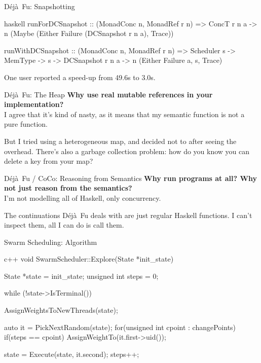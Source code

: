 \documentclass{beamer}
\newcommand{\dejafu}{D\'{e}j\`{a}~Fu}
\begin{document}
\begin{frame}[fragile]{\dejafu{}: Snapshotting}
\begin{center}
\begin{cminted}{haskell}
runForDCSnapshot :: (MonadConc n, MonadRef r n)
  => ConcT r n a
  -> n (Maybe (Either Failure (DCSnapshot r n a), Trace))

runWithDCSnapshot :: (MonadConc n, MonadRef r n)
  => Scheduler s
  -> MemType
  -> s
  -> DCSnapshot r n a
  -> n (Either Failure a, s, Trace)
\end{cminted}
\end{center}

One user reported a speed-up from 49.6s to 3.0s.
\end{frame}

\begin{frame}{\dejafu{}: The Heap}
  \textbf{Why use real mutable references in your implementation?}\\
  I agree that it's kind of nasty, as it means that my semantic
  function is not a pure function.

  But I tried using a heterogeneous map, and decided not to after
  seeing the overhead.  There's also a garbage collection problem: how
  do you know you can delete a key from your map?
\end{frame}

\begin{frame}{\dejafu{} / CoCo: Reasoning from Semantics}
  \textbf{Why run programs at all?  Why not just reason from the semantics?}\\
  I'm not modelling all of Haskell, only concurrency.

  The continuations \dejafu{} deals with are just regular Haskell
  functions.  I can't inspect them, all I can do is call them.
\end{frame}

\begin{frame}[fragile]{Swarm Scheduling: Algorithm}
\begin{center}
\begin{cminted}{c++}
void SwarmScheduler::Explore(State *init_state) {
  State *state = init_state;
  unsigned int steps = 0;

  while (!state->IsTerminal()) {
    AssignWeightsToNewThreads(state);

    auto it = PickNextRandom(state);
    for(unsigned int cpoint : changePoints) {
      if(steps == cpoint) {
        AssignWeightTo(it.first->uid());
      }
    }

    state = Execute(state, it.second);
    steps++;
  }
}
\end{cminted}
\end{center}
\end{frame}
\end{document}
